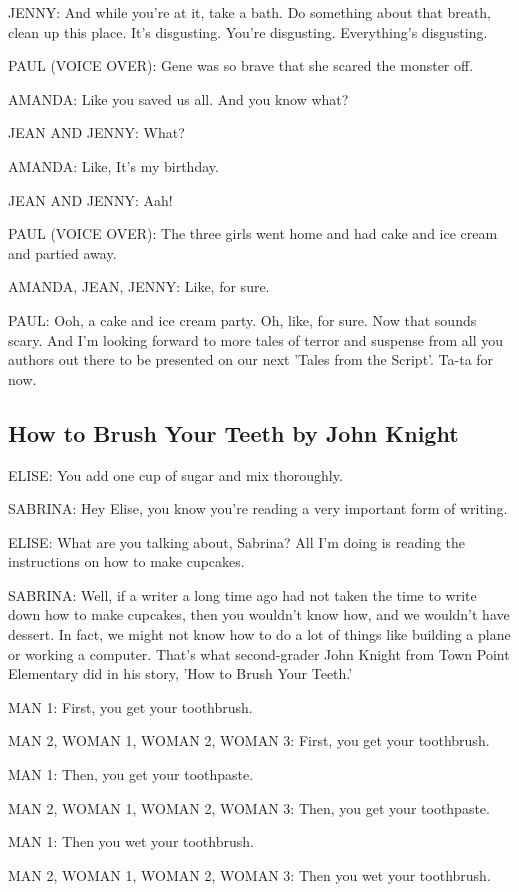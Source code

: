 JENNY:
And while you're at it, take a bath.
Do something about that breath, clean up this place.
It's disgusting.
You're disgusting.
Everything's disgusting.

PAUL (VOICE OVER):
Gene was so brave that she scared the monster off.

AMANDA:
Like you saved us all.
And you know what?

JEAN AND JENNY:
What?

AMANDA:
Like, It's my birthday.

JEAN AND JENNY:
Aah!

PAUL (VOICE OVER):
The three girls went home and had cake and ice cream and partied away.

AMANDA, JEAN, JENNY:
Like, for sure.

PAUL:
Ooh, a cake and ice cream party.
Oh, like, for sure.
Now that sounds scary.
And I'm looking forward to more tales of terror and suspense from all you authors out there to be presented on our next 'Tales from the Script'.
Ta-ta for now.

\subsection{How to Brush Your Teeth by John Knight}

ELISE:
You add one cup of sugar and mix thoroughly.

SABRINA:
Hey Elise, you know you're reading a very important form of writing.

ELISE:
What are you talking about, Sabrina? All I'm doing is reading the instructions on how to make cupcakes.

SABRINA:
Well, if a writer a long time ago had not taken the time to write down how to make cupcakes, then you wouldn't know how, and we wouldn't have dessert.
In fact, we might not know how to do a lot of things like building a plane or working a computer.
That's what second-grader John Knight from Town Point Elementary did in his story, 'How to Brush Your Teeth.'

MAN 1:
First, you get your toothbrush.

MAN 2, WOMAN 1, WOMAN 2, WOMAN 3:
First, you get your toothbrush.

MAN 1:
Then, you get your toothpaste.

MAN 2, WOMAN 1, WOMAN 2, WOMAN 3:
Then, you get your toothpaste.

MAN 1:
Then you wet your toothbrush.

MAN 2, WOMAN 1, WOMAN 2, WOMAN 3:
Then you wet your toothbrush.


